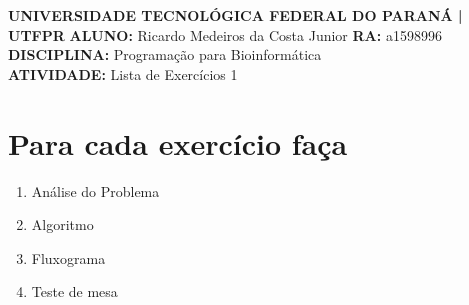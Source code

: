 \documentclass[a4paper, 12pt]{article}
\begin{document}
\noident
\textbf{UNIVERSIDADE TECNOLÓGICA FEDERAL DO PARANÁ | UTFPR}
\textbf{ALUNO:} Ricardo Medeiros da Costa Junior   \textbf{RA:} a1598996 \\
\textbf{DISCIPLINA:} Programação para Bioinformática \\
\textbf{ATIVIDADE:} Lista de Exercícios 1  

\section{Para cada exercício faça}
\begin{enumerate}
\item Análise do Problema
\item Algoritmo
\item Fluxograma
\item Teste de mesa
\end{enumerate}
\end{document}
